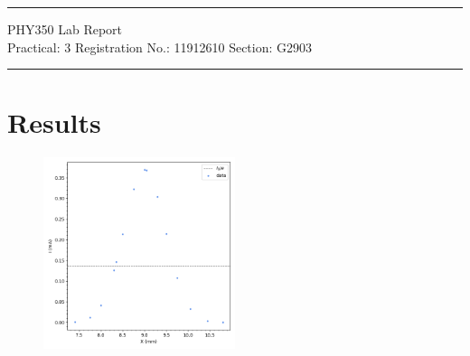 \documentclass{article}
\begin{document}
	
	\author{Aayush Arya}
	\date{(Submitted: \today)}
	\title{}
	
	\maketitle
	
	\hrule
	\begin{center}
		PHY350 Lab Report\\
		Practical: 3 \quad Registration No.: 11912610 \quad Section: G2903
	\end{center}
	\hrule
	
	\section*{Results}
	
		\begin{figure}[h!]
			\centering
			\includegraphics[width=0.5\textwidth]{figure}
			\caption{}
			\label{fig}
		\end{figure}
	
	
\end{document}
